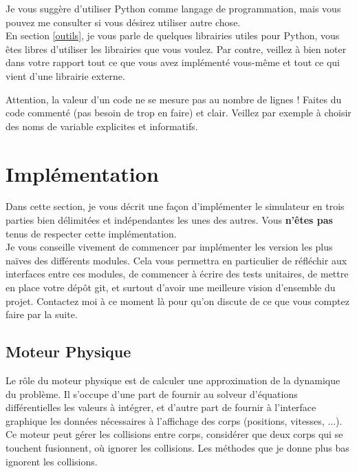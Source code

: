 \documentclass{article}
\begin{document}
\vspace{1em}

\noindent Je vous suggère d'utiliser Python comme langage de programmation, mais vous pouvez me consulter si vous désirez utiliser autre chose. \\
En section \ref{outils}, je vous parle de quelques librairies utiles pour Python, vous êtes libres d'utiliser les librairies que vous voulez. Par contre, veillez à bien noter dans votre rapport tout ce que vous avez implémenté vous-même et tout ce qui vient d'une librairie externe.

Attention, la valeur d'un code ne se mesure pas au nombre de lignes ! Faites du code commenté (pas besoin de trop en faire) et clair. Veillez par exemple à choisir des noms de variable explicites et informatifs.

\pagebreak

\section{Implémentation}

Dans cette section, je vous décrit une façon d'implémenter le simulateur en trois parties bien délimitées et indépendantes les unes des autres. Vous \textbf{n'êtes pas} tenus de respecter cette implémentation. \\
Je vous conseille vivement de commencer par implémenter les version les plus naïves des différents modules. Cela vous permettra en particulier de réfléchir aux interfaces entre ces modules, de commencer à écrire des tests unitaires, de mettre en place votre dépôt git, et surtout d'avoir une meilleure vision d'ensemble du projet. Contactez moi à ce moment là pour qu'on discute de ce que vous comptez faire par la suite.

\subsection{Moteur Physique}
\label{moteurphysique}

Le rôle du moteur physique est de calculer une approximation de la dynamique du problème. Il s'occupe d'une part de fournir au solveur d'équations différentielles les valeurs à intégrer, et d'autre part de fournir à l'interface graphique les données nécessaires à l'affichage des corps (positions, vitesses, ...). \\
Ce moteur peut gérer les collisions entre corps, considérer que deux corps qui se touchent fusionnent, où ignorer les collisions. Les méthodes que je donne plus bas ignorent les collisions.
\end{document}
